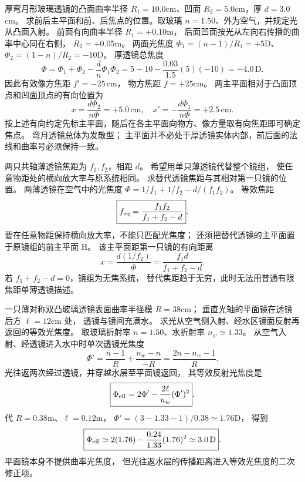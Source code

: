 厚弯月形玻璃透镜的凸面曲率半径
$R_1=10.0$cm、凹面
$R_2=5.0$cm，厚
$d=3.0$cm。
求前后主平面和前、后焦点的位置。取玻璃 $n=1.50$、外为空气，并规定光从凸面入射。
\exsolution
前面有向曲率半径 $R_1=+0.10$m，
后面凹面按光从左向右传播的曲率中心同在右侧，
$R_2=+0.05$m。
两面光焦度
$\Phi_1=(n-1)/R_1=+5$D、
$\Phi_2=(1-n)/R_2=-10$D。
厚透镜总焦度
\[
\Phi=\Phi_1+\Phi_2-\frac d n\Phi_1\Phi_2
=5-10-\frac{0.03}{1.5}(5)(-10)
=\boxed{-4.0\,\mathrm D}.
\]
因此有效像方焦距
$\boxed{f'=-25\,\mathrm{cm}}$，
物方焦距 $f=+25$cm。
两主平面相对于凸面顶点和凹面顶点的有向位置为
\[
\boxed{x=\frac{d\Phi_2}{n\Phi}=+5.0\,\mathrm{cm}},
\quad
\boxed{x'=-\frac{d\Phi_1}{n\Phi}=+2.5\,\mathrm{cm}}.
\]
按上述有向约定先标主平面，随后在各主平面向物方、像方量取有向焦距即可确定焦点。
\excheck 弯月透镜总体为发散型；
主平面并不必处于厚透镜实体内部，前后面的法线和曲率号必须保持一致。

两只共轴薄透镜焦距为
$f_1,f_2$，相距 $d$。
希望用单只薄透镜代替整个镜组，
使任意物距处的横向放大率与原系统相同。
求替代透镜焦距与其相对第一只镜的位置。
\exsolution
两薄透镜在空气中的光焦度
$\Phi=1/f_1+1/f_2-d/(f_1f_2)$。
等效焦距
\[
\boxed{f_{\rm eq}=\frac{f_1f_2}{f_1+f_2-d}}.
\]
要在任意物距保持横向放大率，不能只匹配光焦度；
还须把替代透镜的主平面置于原镜组的前主平面 H。
该主平面距第一只镜的有向距离
\[
\boxed{x=\frac{d(1/f_2)}{\Phi}
=\frac{f_1d}{f_1+f_2-d}}.
\]
\excheck 若 $f_1+f_2-d=0$，镜组为无焦系统，
替代焦距趋于无穷，此时无法用普通有限焦距单薄透镜描述。

一只薄对称双凸玻璃透镜表面曲率半径模
$R=38$cm；
垂直光轴的平面镜在透镜后方
$\ell=12$cm 处，
透镜与镜间充满水。
求光从空气侧入射、经水区镜面反射再返回的等效光焦度。
\exsolution
取玻璃折射率 $n=1.50$、水折射率
$n_w\simeq1.33$。
从空气入射、经透镜进入水中时单次透镜光焦度
\[
\Phi'=\frac{n-1}{R}+
\frac{n_w-n}{-R}
=\frac{2n-n_w-1}{R}.
\]
光往返两次经过透镜，并穿越水层至平面镜返回，
其等效反射光焦度是
\[
\boxed{\Phi_{\rm eff}
=2\Phi'-\frac{2\ell}{n_w}(\Phi')^2}.
\]
代 $R=0.38$m、$\ell=0.12$m，
$\Phi'=(3-1.33-1)/0.38\simeq1.76$D，
得到
\[
\boxed{\Phi_{\rm eff}\simeq
2(1.76)-\frac{0.24}{1.33}(1.76)^2
\simeq3.0\,\mathrm D}.
\]
\excheck 平面镜本身不提供曲率光焦度，
但光往返水层的传播距离进入等效光焦度的二次修正项。

